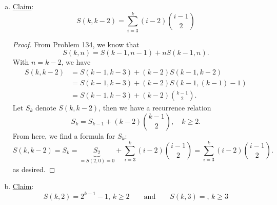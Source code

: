 \documentclass[11pt]{article}
\begin{document}
\begin{enumerate}[(a)]
	\item \underline{Claim}:
	\begin{equation*}
	\boxed{S(k,k-2) = \sum^k_{i=3} (i-2) { {i-1} \choose  2  }}
	\end{equation*}
	
	\begin{proof}
		From Problem 134, we know that 
		\begin{equation*}
		S(k,n) = S(k-1, n-1) + nS(k-1,n).
		\end{equation*}
		With $n=k-2$, we have
		\begin{align*}
		S(k,k-2) &= S(k-1, k-3) + (k-2)S(k-1,k-2)\\
		&= S(k-1, k-3) + (k-2)S(k-1,(k-1)-1)\\
		&= S(k-1, k-3) + (k-2){{k-1} \choose 2}.
		\end{align*}
		Let $S_k$ denote $S(k,k-2)$, then we have a recurrence relation 
		\begin{equation*}
		S_k = S_{k-1} + (k-2){{k-1} \choose 2}, \quad k \geq 2.
		\end{equation*}
		From here, we find a formula for $S_k$:
		\begin{equation*}
		S(k,k-2) = S_k = \underbrace{S_2}_{= S(2,0) = 0} + \sum^{k}_{i=3} (i-2){{i-1} \choose 2} = \sum^{k}_{i=3} (i-2){{i-1} \choose 2}.
		\end{equation*}
		as desired. 
	\end{proof}
	
	
	\item \underline{Claim}:
	\begin{equation*}
	\boxed{S(k,2) = 2^{k-1}-1, \, k\geq 2 \qquad \text{and} \qquad S(k,3) = ,\, k\geq 3}
	\end{equation*}
	

\end{enumerate}
\end{document}

